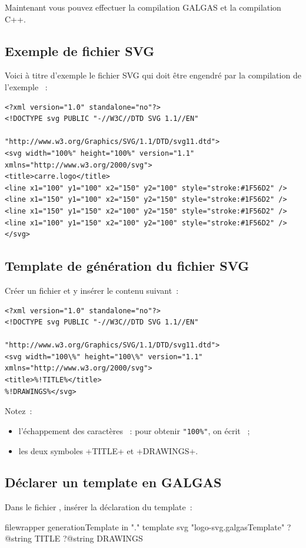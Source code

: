 Maintenant vous pouvez effectuer la compilation GALGAS et la compilation C++.

\subsection{Exemple de fichier SVG}
Voici à titre d'exemple le fichier SVG qui doit être engendré par la compilation de l'exemple ~:

{\singlespacing
\begin{verbatim}
<?xml version="1.0" standalone="no"?>
<!DOCTYPE svg PUBLIC "-//W3C//DTD SVG 1.1//EN"
                              "http://www.w3.org/Graphics/SVG/1.1/DTD/svg11.dtd">
<svg width="100%" height="100%" version="1.1" xmlns="http://www.w3.org/2000/svg">
<title>carre.logo</title>
<line x1="100" y1="100" x2="150" y2="100" style="stroke:#1F56D2" />
<line x1="150" y1="100" x2="150" y2="150" style="stroke:#1F56D2" />
<line x1="150" y1="150" x2="100" y2="150" style="stroke:#1F56D2" />
<line x1="100" y1="150" x2="100" y2="100" style="stroke:#1F56D2" />
</svg>
\end{verbatim}
}

\subsection{Template de génération du fichier SVG}
Créer un fichier  et y insérer le contenu suivant~:
{\singlespacing
\begin{verbatim}
<?xml version="1.0" standalone="no"?>
<!DOCTYPE svg PUBLIC "-//W3C//DTD SVG 1.1//EN"
                                "http://www.w3.org/Graphics/SVG/1.1/DTD/svg11.dtd">
<svg width="100\%" height="100\%" version="1.1" xmlns="http://www.w3.org/2000/svg">
<title>%!TITLE%</title>
%!DRAWINGS%</svg>
\end{verbatim}
}


Notez~:
\begin{itemize}
  \item l'échappement des caractères \tpp{\%}~: pour obtenir \texttt{"100\%"}, on écrit ~;
  \item les deux symboles \ggst+TITLE+ et \ggst+DRAWINGS+.
\end{itemize}

\subsection{Déclarer un template en GALGAS}
Dans le fichier , insérer la déclaration du template~:
\begin{galgas3}
filewrapper generationTemplate in "." {
}{
}{
  template svg "logo-svg.galgasTemplate"
    ?@string TITLE
    ?@string DRAWINGS
}
\end{galgas3}

